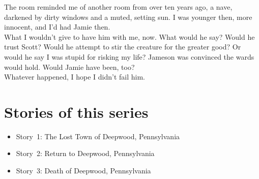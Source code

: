 \documentclass[a5paper]{scrartcl}
\begin{document}
The room reminded me of another room from over ten years ago, a nave, darkened by dirty windows and a muted, setting sun. I was younger then, more innocent, and I'd had Jamie then.\\


What I wouldn't give to have him with me, now.  What would he say? Would he trust Scott? Would he attempt to stir the creature for the greater good? Or would he say I was stupid for risking my life? Jameson was convinced the wards would hold. Would Jamie have been, too?\\


Whatever happened, I hope I didn't fail him.
\clearpage
\section*{Stories of this series}

\begin{itemize}
    \item Story~1: The Lost Town of Deepwood, Pennsylvania
    \item Story~2: Return to Deepwood, Pennsylvania
    \item Story~3: Death of Deepwood, Pennsylvania
\end{itemize}
\end{document}

